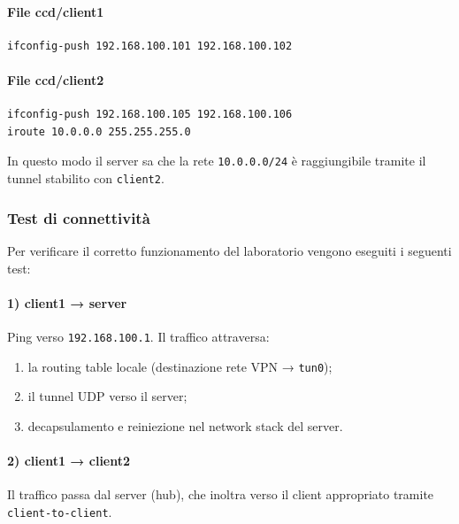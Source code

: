 \paragraph{File ccd/client1}

\begin{verbatim}
ifconfig-push 192.168.100.101 192.168.100.102
\end{verbatim}

\paragraph{File ccd/client2}

\begin{verbatim}
ifconfig-push 192.168.100.105 192.168.100.106
iroute 10.0.0.0 255.255.255.0
\end{verbatim}

In questo modo il server sa che la rete \texttt{10.0.0.0/24} è raggiungibile tramite il tunnel
stabilito con \texttt{client2}.

\subsubsection{Test di connettività}

Per verificare il corretto funzionamento del laboratorio vengono eseguiti i seguenti test:

\paragraph{1) client1 → server}

Ping verso \texttt{192.168.100.1}.
Il traffico attraversa:

\begin{enumerate}
    \item la routing table locale (destinazione rete VPN → \texttt{tun0});
    \item il tunnel UDP verso il server;
    \item decapsulamento e reiniezione nel network stack del server.
\end{enumerate}

\paragraph{2) client1 → client2}

Il traffico passa dal server (hub), che inoltra verso il client appropriato tramite
\verb|client-to-client|.

